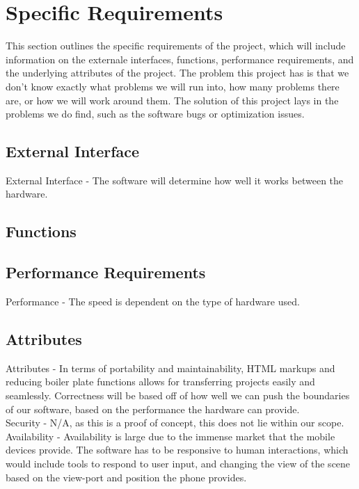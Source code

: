\documentclass[letterpaper,10pt,titlepage,draftclsnofoot,onecolumn,compsoc,utf8,latin1]{IEEEtran}
\begin{document}
\section{Specific Requirements}
\begin{singlespace}
\noindent
This section outlines the specific requirements of the project, which will include information on the externale interfaces, functions, performance requirements, and the underlying attributes of the project. The problem this project has is that we don't know exactly what problems we will run into, how many problems there are, or how we will work around them. The solution of this project lays in the problems we do find, such as the software bugs or optimization issues.

\subsection{External Interface}
\begin{singlespace}
\noindent
External Interface - The software will determine how well it works between the hardware.
\end{singlespace}

\subsection{Functions}
\begin{singlespace}
\noindent

\end{singlespace}

\subsection{Performance Requirements}
\begin{singlespace}
\noindent
Performance - The speed is dependent on the type of hardware used.
\end{singlespace}

\subsection{Attributes}
\begin{singlespace}
\noindent
Attributes - In terms of portability and maintainability, HTML markups and reducing boiler plate functions allows for transferring projects easily and seamlessly.
Correctness will be based off of how well we can push the boundaries of our software, based on the performance the hardware can provide.\\
Security - N/A, as this is a proof of concept, this does not lie within our scope.\\
Availability - Availability is large due to the immense market that the mobile devices provide. The software has to be responsive to human interactions, which would include tools to respond to user input, and changing the view of the scene based on the view-port and position the phone provides.
\end{singlespace}

\end{singlespace}
\end{document}
